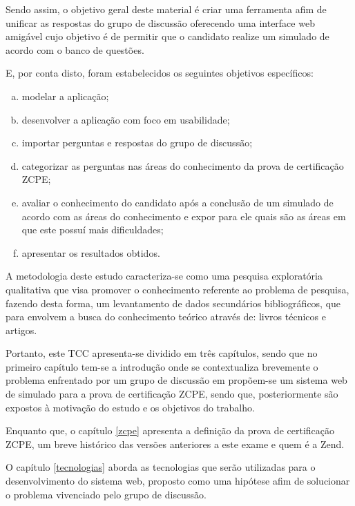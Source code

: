 
Sendo assim, o objetivo geral deste material é criar uma ferramenta afim de
unificar as respostas do grupo de discussão oferecendo uma interface web
amigável cujo objetivo é de permitir que o candidato realize um simulado de
acordo com o banco de questões.


E, por conta disto, foram estabelecidos os seguintes objetivos
específicos:

\begin{enumerate}[a)]
    \item modelar a aplicação;
    \item desenvolver a aplicação com foco em usabilidade;
    \item importar perguntas e respostas do grupo de discussão;
    \item categorizar as perguntas nas áreas do conhecimento da prova de
    certificação \acs{ZCPE};
    \item avaliar o conhecimento do candidato após a conclusão de um simulado 
    de acordo com as áreas do conhecimento e expor para ele quais são as áreas  em
    que este possuí mais dificuldades;
    \item apresentar os resultados obtidos.
\end{enumerate}


A metodologia deste estudo caracteriza-se como uma pesquisa exploratória
qualitativa que visa promover o conhecimento referente ao problema de pesquisa, fazendo desta forma,
um levantamento de dados secundários bibliográficos, que para
 envolvem a busca do conhecimento 
teórico através de: livros técnicos e artigos.

Portanto, este TCC apresenta-se dividido em três capítulos, sendo que no
primeiro capítulo tem-se a introdução onde se contextualiza brevemente o problema
enfrentado por um grupo de discussão em propõem-se um sistema web de
simulado para a prova de certificação \acs{ZCPE}, sendo que, posteriormente são
expostos à motivação do estudo e os objetivos do trabalho.

Enquanto que, o capítulo \ref{zcpe} apresenta a definição da prova de
certificação \acl{ZCPE}, um breve histórico das versões anteriores a este
exame e quem é a \acs{Zend}.

O capítulo \ref{tecnologias} aborda as tecnologias que serão utilizadas para o
desenvolvimento do sistema web, proposto como uma hipótese afim de solucionar
o problema vivenciado pelo grupo de discussão.


